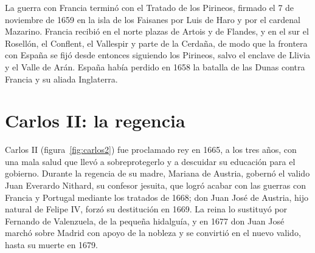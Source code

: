 \documentclass{book}
\begin{document}

La guerra con Francia terminó con el Tratado de los Pirineos, firmado el 7 de noviembre de 1659 en la isla de los Faisanes por Luis de Haro y por el cardenal Mazarino. Francia recibió en el norte plazas de Artois y de Flandes, y en el sur el Rosellón, el Conflent, el Vallespir y parte de la Cerdaña, de modo que la frontera con España se fijó desde entonces siguiendo los Pirineos, salvo el enclave de Llivia y el Valle de Arán. España había perdido en 1658 la batalla de las Dunas contra Francia y su aliada Inglaterra.


\section{Carlos II: la regencia}

Carlos II (figura~\ref{fig:carlos2}) fue proclamado rey en 1665, a los tres años, con una mala salud que llevó a sobreprotegerlo y a descuidar su educación para el gobierno. Durante la regencia de su madre, Mariana de Austria, gobernó el valido Juan Everardo Nithard, su confesor jesuita, que logró acabar con las guerras con Francia y Portugal mediante los tratados de 1668; don Juan José de Austria, hijo natural de Felipe IV, forzó su destitución en 1669. La reina lo sustituyó por Fernando de Valenzuela, de la pequeña hidalguía, y en 1677 don Juan José marchó sobre Madrid con apoyo de la nobleza y se convirtió en el nuevo valido, hasta su muerte en 1679.

\end{document}
